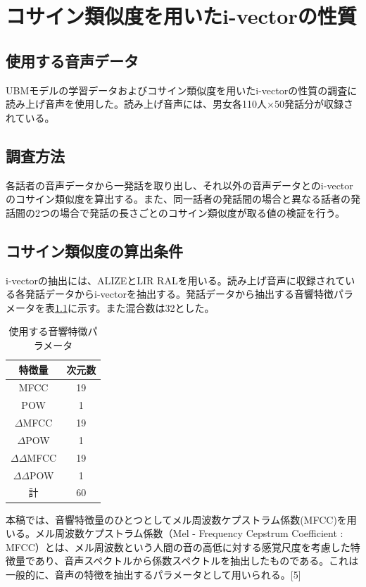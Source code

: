 \chapter{コサイン類似度を用いたi-vectorの性質}
\label{section:pre_cos}
\section{使用する音声データ}
\label{section:detail_ATR}
UBMモデルの学習データおよびコサイン類似度を用いたi-vectorの性質の調査に読み上げ音声\cite{ATR}を使用した。読み上げ音声には、男女各110人$×$50発話分が収録されている。

\section{調査方法}
各話者の音声データから一発話を取り出し、それ以外の音声データとのi-vectorのコサイン類似度を算出する。また、同一話者の発話間の場合と異なる話者の発話間の2つの場合で発話の長さごとのコサイン類似度が取る値の検証を行う。\par

\section{コサイン類似度の算出条件}
i-vectorの抽出には、ALIZEとLIR RAL\cite{alize}を用いる。読み上げ音声に収録されている各発話データからi-vectorを抽出する。発話データから抽出する音響特徴パラメータを表\ref{iv_feature}に示す。また混合数は32とした。

\begin{table}[H]
  \begin{center}
    \caption{使用する音響特徴パラメータ}
    \label{iv_feature}
    \begin{tabular}{|c||c|} \hline
      特徴量 & 次元数\\ \hline
      MFCC & 19  \\ 
      POW & 1  \\ 
      $\Delta$MFCC & 19 \\ 
      $\Delta$POW & 1 \\ 
      $\Delta\Delta$MFCC & 19 \\ 
      $\Delta\Delta$POW & 1 \\ \hline
      計 & 60 \\ \hline
    \end{tabular}
  \end{center}
\end{table}

本稿では、音響特徴量のひとつとしてメル周波数ケプストラム係数(MFCC)を用いる。メル周波数ケプストラム係数（Mel - Frequency Cepstrum Coefficient : MFCC）とは、メル周波数という人間の音の高低に対する感覚尺度を考慮した特徴量であり、音声スペクトルから係数スペクトルを抽出したものである。これは一般的に、音声の特徴を抽出するパラメータとして用いられる。[5]

